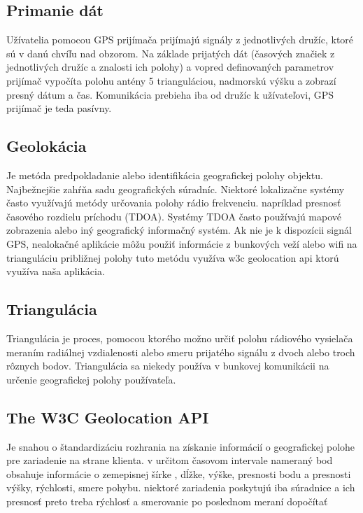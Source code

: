 \subsection{Primanie dát}

Užívatelia pomocou GPS prijímača prijímajú signály z jednotlivých družíc, ktoré sú v danú
chvíľu nad obzorom. Na základe prijatých dát (časových značiek z jednotlivých družíc a
znalosti ich polohy) a vopred definovaných parametrov prijímač vypočíta polohu antény
5
trianguláciou, nadmorskú výšku a zobrazí presný dátum a čas. Komunikácia prebieha iba od
družíc k užívateľovi, GPS prijímač je teda pasívny.


\subsection{Geolokácia}

Je metóda predpokladanie alebo identifikácia geografickej polohy objektu. Najbežnejšie
zahŕňa sadu geografických súradníc. Niektoré lokalizačne systémy často využívajú metódy
určovania polohy rádio frekvenciu. napríklad presnosť časového rozdielu príchodu (TDOA).
Systémy TDOA často používajú mapové zobrazenia alebo iný geografický informačný
systém. Ak nie je k dispozícii signál GPS, nealokačné aplikácie môžu použiť informácie z
bunkových veží alebo wifi na trianguláciu približnej polohy tuto metódu využíva w3c
geolocation api ktorú využíva naša aplikácia. 
 
\subsection{Triangulácia}

Triangulácia je proces, pomocou ktorého možno určiť polohu rádiového vysielača meraním
radiálnej vzdialenosti alebo smeru prijatého signálu z dvoch alebo troch rôznych bodov.
Triangulácia sa niekedy používa v bunkovej komunikácii na určenie geografickej polohy
používateľa.




\subsection{The W3C Geolocation API}

Je snahou o štandardizáciu rozhrania na získanie informácií o geografickej polohe pre
zariadenie na strane klienta.
v určitom časovom intervale nameraný bod obsahuje informácie o zemepisnej šírke , dĺžke,
výške, presnosti bodu a presnosti výšky, rýchlosti, smere pohybu. niektoré zariadenia
poskytujú iba súradnice a ich presnosť preto treba rýchlosť a smerovanie po poslednom
meraní dopočítať



